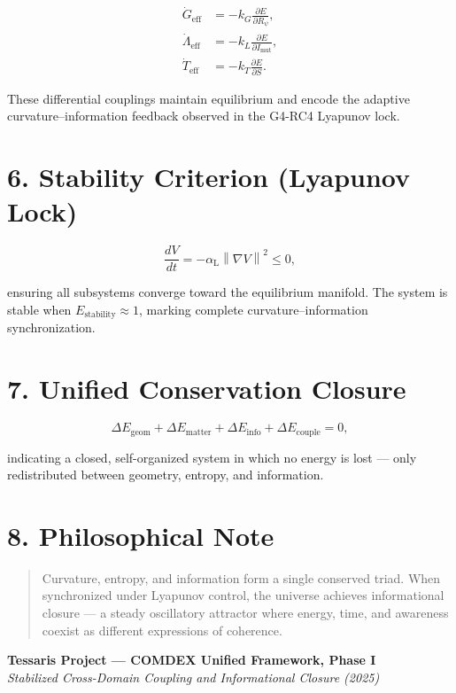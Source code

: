 \documentclass{article}
\begin{document}
\begin{align}
\dot{G}_{\text{eff}} &= -k_G \frac{\partial E}{\partial R_{\psi}}, \\
\dot{\Lambda}_{\text{eff}} &= -k_L \frac{\partial E}{\partial I_{\text{mut}}}, \\
\dot{T}_{\text{eff}} &= -k_T \frac{\partial E}{\partial S}.
\end{align}

\noindent
These differential couplings maintain equilibrium and encode the adaptive curvature–information feedback observed in the G4-RC4 Lyapunov lock.

\vspace{1em}

\section*{6. Stability Criterion (Lyapunov Lock)}

\begin{equation}
\frac{dV}{dt} = -\alpha_{\text{L}} \left\| \nabla V \right\|^2 \le 0,
\end{equation}

\noindent
ensuring all subsystems converge toward the equilibrium manifold.  
The system is stable when $E_{\text{stability}} \approx 1$, marking complete curvature–information synchronization.

\vspace{1em}

\section*{7. Unified Conservation Closure}

\begin{equation}
\Delta E_{\text{geom}} + \Delta E_{\text{matter}} + \Delta E_{\text{info}} + \Delta E_{\text{couple}} = 0,
\end{equation}

indicating a closed, self-organized system in which no energy is lost — only redistributed between geometry, entropy, and information.

\vspace{2em}

\section*{8. Philosophical Note}

\begin{quote}
Curvature, entropy, and information form a single conserved triad.  
When synchronized under Lyapunov control, the universe achieves informational closure —  
a steady oscillatory attractor where energy, time, and awareness coexist as different expressions of coherence.
\end{quote}

\vspace{2em}

\begin{center}
\textbf{Tessaris Project — COMDEX Unified Framework, Phase I}\\
\textit{Stabilized Cross-Domain Coupling and Informational Closure (2025)}
\end{center}
\end{document}
